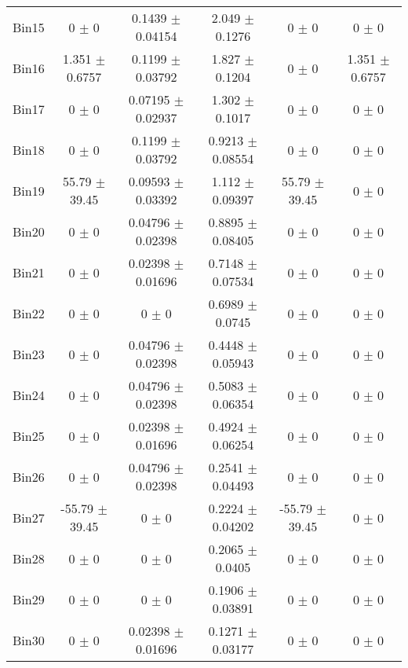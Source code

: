 \begin{tabular}{@{\extracolsep{4pt}}lccccc@{}}
     Bin15 & 0 $\pm$ 0 & 0.1439 $\pm$ 0.04154 & 2.049 $\pm$ 0.1276 & 0 $\pm$ 0 & 0 $\pm$ 0 \\ 
     Bin16 & 1.351 $\pm$ 0.6757 & 0.1199 $\pm$ 0.03792 & 1.827 $\pm$ 0.1204 & 0 $\pm$ 0 & 1.351 $\pm$ 0.6757 \\ 
     Bin17 & 0 $\pm$ 0 & 0.07195 $\pm$ 0.02937 & 1.302 $\pm$ 0.1017 & 0 $\pm$ 0 & 0 $\pm$ 0 \\ 
     Bin18 & 0 $\pm$ 0 & 0.1199 $\pm$ 0.03792 & 0.9213 $\pm$ 0.08554 & 0 $\pm$ 0 & 0 $\pm$ 0 \\ 
     Bin19 & 55.79 $\pm$ 39.45 & 0.09593 $\pm$ 0.03392 & 1.112 $\pm$ 0.09397 & 55.79 $\pm$ 39.45 & 0 $\pm$ 0 \\ 
     Bin20 & 0 $\pm$ 0 & 0.04796 $\pm$ 0.02398 & 0.8895 $\pm$ 0.08405 & 0 $\pm$ 0 & 0 $\pm$ 0 \\ 
     Bin21 & 0 $\pm$ 0 & 0.02398 $\pm$ 0.01696 & 0.7148 $\pm$ 0.07534 & 0 $\pm$ 0 & 0 $\pm$ 0 \\ 
     Bin22 & 0 $\pm$ 0 & 0 $\pm$ 0 & 0.6989 $\pm$ 0.0745 & 0 $\pm$ 0 & 0 $\pm$ 0 \\ 
     Bin23 & 0 $\pm$ 0 & 0.04796 $\pm$ 0.02398 & 0.4448 $\pm$ 0.05943 & 0 $\pm$ 0 & 0 $\pm$ 0 \\ 
     Bin24 & 0 $\pm$ 0 & 0.04796 $\pm$ 0.02398 & 0.5083 $\pm$ 0.06354 & 0 $\pm$ 0 & 0 $\pm$ 0 \\ 
     Bin25 & 0 $\pm$ 0 & 0.02398 $\pm$ 0.01696 & 0.4924 $\pm$ 0.06254 & 0 $\pm$ 0 & 0 $\pm$ 0 \\ 
     Bin26 & 0 $\pm$ 0 & 0.04796 $\pm$ 0.02398 & 0.2541 $\pm$ 0.04493 & 0 $\pm$ 0 & 0 $\pm$ 0 \\ 
     Bin27 & -55.79 $\pm$ 39.45 & 0 $\pm$ 0 & 0.2224 $\pm$ 0.04202 & -55.79 $\pm$ 39.45 & 0 $\pm$ 0 \\ 
     Bin28 & 0 $\pm$ 0 & 0 $\pm$ 0 & 0.2065 $\pm$ 0.0405 & 0 $\pm$ 0 & 0 $\pm$ 0 \\ 
     Bin29 & 0 $\pm$ 0 & 0 $\pm$ 0 & 0.1906 $\pm$ 0.03891 & 0 $\pm$ 0 & 0 $\pm$ 0 \\ 
     Bin30 & 0 $\pm$ 0 & 0.02398 $\pm$ 0.01696 & 0.1271 $\pm$ 0.03177 & 0 $\pm$ 0 & 0 $\pm$ 0 \\ 
\hline\hline
  \end{tabular}
